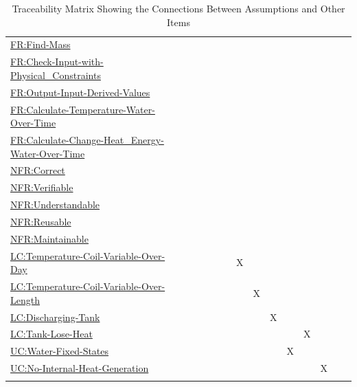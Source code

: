 \documentclass[12pt]{article}
\begin{document}
\begin{longtable}{l l l l l l l l l l l l l l l}
\\
\hyperref[findMass]{FR:Find-Mass} &  &  &  &  &  &  &  &  &  &  &  &  &  & 
\\
\hyperref[checkWithPhysConsts]{FR:Check-Input-with-Physical\_Constraints} &  &  &  &  &  &  &  &  &  &  &  &  &  & 
\\
\hyperref[outputInputDerivVals]{FR:Output-Input-Derived-Values} &  &  &  &  &  &  &  &  &  &  &  &  &  & 
\\
\hyperref[calcTempWtrOverTime]{FR:Calculate-Temperature-Water-Over-Time} &  &  &  &  &  &  &  &  &  &  &  &  &  & 
\\
\hyperref[calcChgHeatEnergyWtrOverTime]{FR:Calculate-Change-Heat\_Energy-Water-Over-Time} &  &  &  &  &  &  &  &  &  &  &  &  &  & 
\\
\hyperref[correct]{NFR:Correct} &  &  &  &  &  &  &  &  &  &  &  &  &  & 
\\
\hyperref[verifiable]{NFR:Verifiable} &  &  &  &  &  &  &  &  &  &  &  &  &  & 
\\
\hyperref[understandable]{NFR:Understandable} &  &  &  &  &  &  &  &  &  &  &  &  &  & 
\\
\hyperref[reusable]{NFR:Reusable} &  &  &  &  &  &  &  &  &  &  &  &  &  & 
\\
\hyperref[maintainable]{NFR:Maintainable} &  &  &  &  &  &  &  &  &  &  &  &  &  & 
\\
\hyperref[likeChgTCVOD]{LC:Temperature-Coil-Variable-Over-Day} &  &  &  &  &  &  & X &  &  &  &  &  &  & 
\\
\hyperref[likeChgTCVOL]{LC:Temperature-Coil-Variable-Over-Length} &  &  &  &  &  &  &  & X &  &  &  &  &  & 
\\
\hyperref[likeChgDT]{LC:Discharging-Tank} &  &  &  &  &  &  &  &  & X &  &  &  &  & 
\\
\hyperref[likeChgTLH]{LC:Tank-Lose-Heat} &  &  &  &  &  &  &  &  &  &  & X &  &  & 
\\
\hyperref[unlikeChgWFS]{UC:Water-Fixed-States} &  &  &  &  &  &  &  &  &  & X &  &  &  & 
\\
\hyperref[unlikeChgNIHG]{UC:No-Internal-Heat-Generation} &  &  &  &  &  &  &  &  &  &  &  & X &  & 
\\
\bottomrule
\caption{Traceability Matrix Showing the Connections Between Assumptions and Other Items}
\label{Table:TraceMatAvsAll}
\end{longtable}
\end{document}
